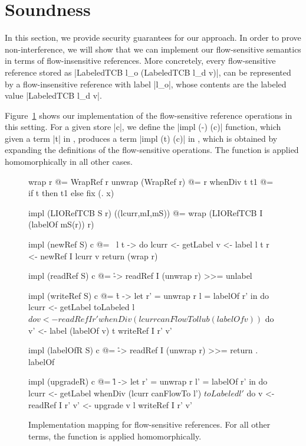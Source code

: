 \section{Soundness}
\label{sec:soundness}

In this section, we provide security guarantees for our approach. In
order to prove non-interference, we will show that we can implement
our flow-sensitive semantics in terms of flow-insensitive
references. More concretely, every flow-sensitive reference stored as
|LabeledTCB l_o (LabeledTCB l_d v)|, can be represented by a
flow-insensitive reference with label |l_o|, whose contents are the
labeled value |LabeledTCB l_d v|.

Figure~\ref{fig:fs-exts-semantics-impl} shows our implementation of
the flow-sensitive reference operations in this setting.  For a given
store |c|, we define the |impl (-) (c)| function, which given a term |t|
in \liofs{}, produces a term |impl (t) (c)| in \lio{}, which is obtained
by expanding the definitions of the flow-sensitive operations. The
function is applied homomorphically in all other cases.

\begin{figure}
\small
\begin{code}
wrap r @= WrapRef r
unwrap (WrapRef r) @= r
whenDiv t t1 @= if t then t1 else fix (\x. x)

impl (LIORefTCB S r) ((lcurr,mI,mS)) @= wrap (LIORefTCB I (labelOf mS(r)) r)

impl (newRef S) c @= \ l t -> do
  lcurr  <- getLabel
  v      <- label l t
  r      <- newRef I lcurr v
  return (wrap r)


impl (readRef S) c @= \r -> readRef I (unwrap r) >>= unlabel


impl (writeRef S) c @= \r t -> let  r'  = unwrap r
                                    l   = labelOf r' in do
  lcurr <- getLabel
  toLabeled l $ do
     v   <- readRef I r'
     whenDiv (lcurr canFlowTo l lub (labelOf v)) $ do
       v'  <- label (labelOf v) t
       writeRef I r' v'


impl (labelOfR S) c @= \r -> readRef I (unwrap r) >>= return . labelOf

impl (upgradeR) c @= \r l -> let  r'  = unwrap r
                                  l'  = labelOf r' in do
  lcurr <- getLabel
  whenDiv (lcurr canFlowTo l') $ toLabeled l' $ do
     v   <- readRef I r'
     v'  <- upgrade v l
     writeRef I r' v'

\end{code}
\caption{Implementation mapping for flow-sensitive references. For all other terms, the function is applied homomorphically.\label{fig:fs-exts-semantics-impl}}
\end{figure}

